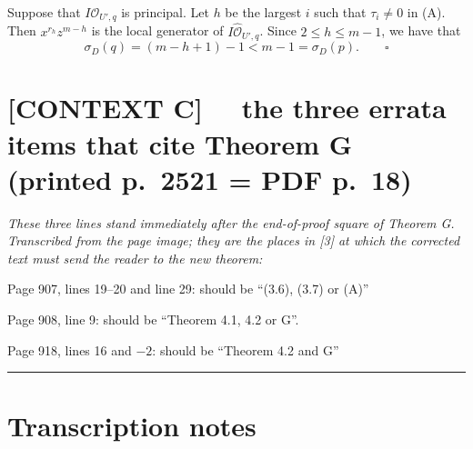 \documentclass[11pt]{article}
\newcommand{\OO}{\mathcal{O}}                  %
\newcommand{\OH}{\widehat{\mathcal{O}}}        %
\begin{document}
Suppose that $I\OO_{U',q}$ is principal. Let $h$ be the largest $i$ such that $\tau_i \neq 0$
in (A). Then $x^{r_h} z^{m-h}$ is the local generator of $I\OH_{U',q}$. Since
$2 \leqslant h \leqslant m - 1$, we have that
\[
\sigma_D(q) = (m - h + 1) - 1 < m - 1 = \sigma_D(p). \qquad \square
\]

\section*{[CONTEXT C] \ \ the three errata items that cite Theorem G \quad (printed p.\ 2521 = PDF p.\ 18)}

\emph{These three lines stand immediately after the end-of-proof square of Theorem G.
Transcribed from the page image; they are the places in [3] at which the corrected text
must send the reader to the new theorem:}

\medskip
Page 907, lines 19--20 and line 29: should be ``(3.6), (3.7) or (A)''

Page 908, line 9: should be ``Theorem 4.1, 4.2 or G''.

Page 918, lines 16 and $-2$: should be ``Theorem 4.2 and G''

\vspace{1em}
\hrule
\vspace{1em}

\section*{Transcription notes}
\end{document}
